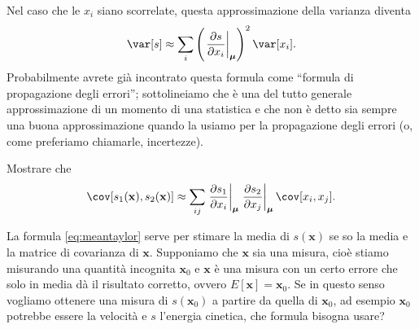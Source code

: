 Nel caso che le $x_i$ siano scorrelate, questa approssimazione della varianza diventa
\begin{equation*}
	\var[s] \approx \sum_i
	\left( \left.\frac{\partial s}{\partial x_i}\right|_{\boldsymbol\mu} \right)^2
	\var[x_i].
\end{equation*}
Probabilmente avrete già incontrato questa formula come ``formula di propagazione degli errori'';
sottolineiamo che è una del tutto generale approssimazione di un momento di una statistica e che non è detto sia sempre una buona approssimazione quando la usiamo per la propagazione degli errori (o, come preferiamo chiamarle, incertezze).

\begin{exercise}
	Mostrare che
	\begin{equation*}
		\cov[s_1(\mathbf x), s_2(\mathbf x)] \approx
		\sum_{ij}
		\left.\frac{\partial s_1}{\partial x_i}\right|_{\boldsymbol\mu}
		\left.\frac{\partial s_2}{\partial x_j}\right|_{\boldsymbol\mu}
		\cov[x_i,x_j].
	\end{equation*}
\end{exercise}

\begin{exercise}
    La formula \eqref{eq:meantaylor} serve per stimare la media di $s(\mathbf
    x)$ se so la media e la matrice di covarianza di $\mathbf x$. Supponiamo
    che $\mathbf x$ sia una misura, cioè stiamo misurando una quantità
    incognita $\mathbf x_0$ e $\mathbf x$ è una misura con un certo errore che
    solo in media dà il risultato corretto, ovvero $E[\mathbf x] = \mathbf
    x_0$. Se in questo senso vogliamo ottenere una misura di $s(\mathbf x_0)$ a
    partire da quella di $\mathbf x_0$, ad esempio $\mathbf x_0$ potrebbe
    essere la velocità e $s$ l'energia cinetica, che formula bisogna usare?
\end{exercise}

